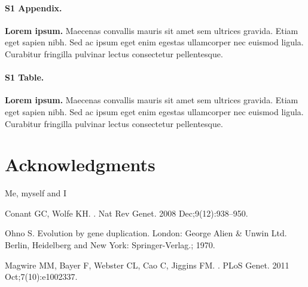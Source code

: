 \documentclass[10pt,letterpaper]{article}
\begin{document}
\paragraph*{S1 Appendix.}
\label{S1_Appendix}
{\bf Lorem ipsum.} Maecenas convallis mauris sit amet sem ultrices gravida. Etiam eget sapien nibh. Sed ac ipsum eget enim egestas ullamcorper nec euismod ligula. Curabitur fringilla pulvinar lectus consectetur pellentesque.

\paragraph*{S1 Table.}
\label{S1_Table}
{\bf Lorem ipsum.} Maecenas convallis mauris sit amet sem ultrices gravida. Etiam eget sapien nibh. Sed ac ipsum eget enim egestas ullamcorper nec euismod ligula. Curabitur fringilla pulvinar lectus consectetur pellentesque.

\section*{Acknowledgments}
Me, myself and I

\nolinenumbers

%
%
% 
\begin{thebibliography}{10}

Conant GC, Wolfe KH.
.
\newblock Nat Rev Genet. 2008 Dec;9(12):938--950.

Ohno S.
\newblock Evolution by gene duplication.
\newblock London: George Alien \& Unwin Ltd. Berlin, Heidelberg and New York:
  Springer-Verlag.; 1970.

Magwire MM, Bayer F, Webster CL, Cao C, Jiggins FM.
.
\newblock PLoS Genet. 2011 Oct;7(10):e1002337.

\end{thebibliography}

\FloatBarrier
\end{document}
